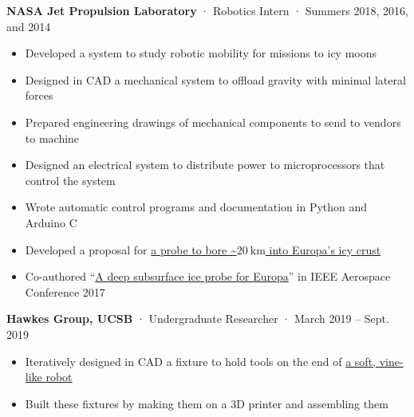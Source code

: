 \documentclass[12pt, oneside]{article}
\newcommand{\jobtitle}[3] {
	{\bf #1} · {#2} · {#3} \vspace{-7pt} \\
}
\begin{document}
\begin{flushleft}
\jobtitle{NASA Jet Propulsion Laboratory}{Robotics Intern}{Summers 2018, 2016, and 2014}
\begin{itemize}
	\item Developed a system to study robotic mobility for missions to icy moons \\
	\item Designed in CAD a mechanical system to offload gravity with minimal lateral forces \\
	\item Prepared engineering drawings of mechanical components to send to vendors to machine \\
	\item Designed an electrical system to distribute power to microprocessors that control the system \\
	\item Wrote automatic control programs and documentation in Python and Arduino C \\
	\item Developed a proposal for \href{https://portfolium.com/entry/owms-deep-subsurface-access-level-wind}{a probe to bore \textasciitilde$\SI{20}{\kilo\meter}$ into Europa's icy crust} \\
	\item Co-authored ``\href{https://www.researchgate.net/publication/317702124_A_deep_subsurface_ice_probe_for_Europa}{A deep subsurface ice probe for Europa}'' in IEEE Aerospace Conference 2017 \\
\end{itemize}

\jobtitle{Hawkes Group, UCSB}{Undergraduate Researcher}{March 2019 – Sept. 2019}
\begin{itemize}
	\item Iteratively designed in CAD a fixture to hold tools on the end of \href{https://portfolium.com/entry/vine-robot-tool-mount}{a soft, vine-like robot} \\
	\item Built these fixtures by making them on a 3D printer and assembling them \\
\end{itemize}


\end{flushleft}
\end{document}
